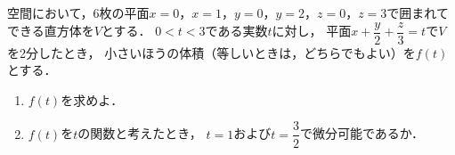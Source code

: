 \documentclass[../../main.tex]{subfiles}
\begin{document}
空間において，6枚の平面$x=0$，$x=1$，$y=0$，$y=2$，$z=0$，$z=3$で囲まれてできる直方体を$V$とする．
$0<t<3$である実数$t$に対し，
平面$\displaystyle x+\dfrac{y}{2}+\dfrac{z}{3}=t$で$V$を2分したとき，
小さいほうの体積（等しいときは，どちらでもよい）を$f(t)$とする．
\begin{enumerate}
  \item $f(t)$を求めよ．
  \item $f(t)$を$t$の関数と考えたとき，
    $t=1$および$\displaystyle t=\dfrac{3}{2}$で微分可能であるか．
\end{enumerate}
\end{document}
